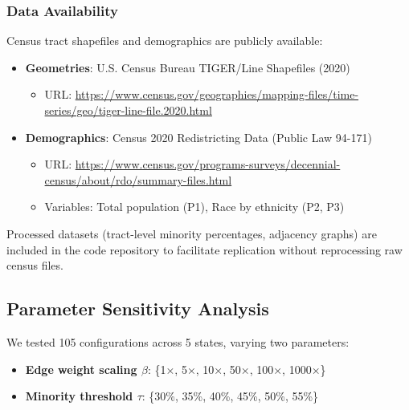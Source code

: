 \subsubsection{Data Availability}

Census tract shapefiles and demographics are publicly available:
\begin{itemize}
    \item \textbf{Geometries}: U.S. Census Bureau TIGER/Line Shapefiles (2020)
    \begin{itemize}
        \item URL: \url{https://www.census.gov/geographies/mapping-files/time-series/geo/tiger-line-file.2020.html}
    \end{itemize}
    \item \textbf{Demographics}: Census 2020 Redistricting Data (Public Law 94-171)
    \begin{itemize}
        \item URL: \url{https://www.census.gov/programs-surveys/decennial-census/about/rdo/summary-files.html}
    \item Variables: Total population (P1), Race by ethnicity (P2, P3)
    \end{itemize}
\end{itemize}

Processed datasets (tract-level minority percentages, adjacency graphs) are included in the code repository to facilitate replication without reprocessing raw census files.

\subsection{Parameter Sensitivity Analysis}

We tested 105 configurations across 5 states, varying two parameters:

\begin{itemize}
    \item \textbf{Edge weight scaling $\beta$}: \{1×, 5×, 10×, 50×, 100×, 1000×\}
    \item \textbf{Minority threshold $\tau$}: \{30\%, 35\%, 40\%, 45\%, 50\%, 55\%\}
\end{itemize}

